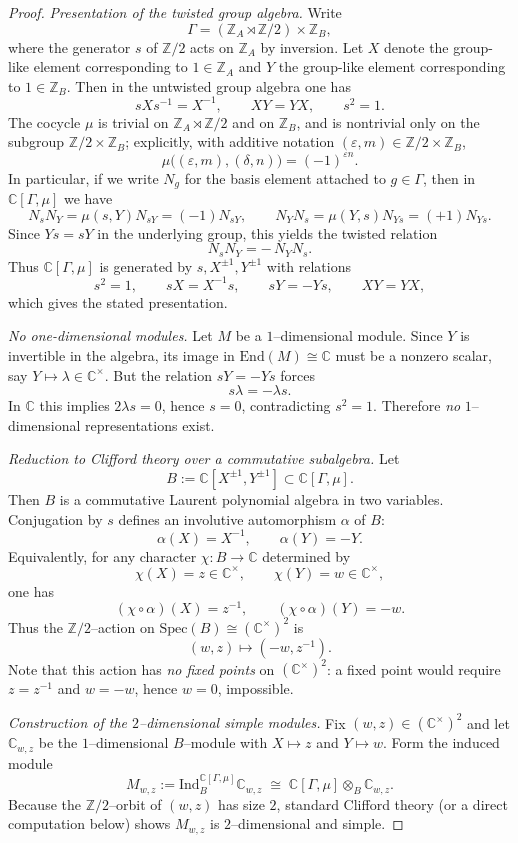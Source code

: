 \documentclass[10pt,a4paper]{amsart}
\newcommand{\C}{\mathbb{C}}
\def\Ind{\mathrm{Ind}}
\def\Spec{\mathrm{Spec}}
\newcommand{\Z}{\mathbb{Z}}
\begin{document}
\begin{proof}
\emph{Presentation of the twisted group algebra.}
Write
\[
\Gamma=(\Z_A\rtimes \Z/2)\times \Z_B,
\]
where the generator $s$ of $\Z/2$ acts on $\Z_A$ by inversion.
Let $X$ denote the group-like element corresponding to $1\in \Z_A$
and $Y$ the group-like element corresponding to $1\in \Z_B$.
Then in the untwisted group algebra one has
\[
sXs^{-1}=X^{-1},\qquad XY=YX,\qquad s^2=1.
\]
The cocycle $\mu$ is trivial on $\Z_A\rtimes \Z/2$ and on $\Z_B$,
and is nontrivial only on the subgroup $\Z/2\times \Z_B$; explicitly,
with additive notation $(\varepsilon,m)\in \Z/2\times\Z_B$,
\[
\mu\bigl((\varepsilon,m),(\delta,n)\bigr)=(-1)^{\varepsilon n}.
\]
In particular, if we write $N_g$ for the basis element attached to $g\in\Gamma$,
then in $\C[\Gamma,\mu]$ we have
\[
N_sN_Y=\mu(s,Y)N_{sY}=(-1)N_{sY},\qquad
N_YN_s=\mu(Y,s)N_{Ys}=(+1)N_{Ys}.
\]
Since $Ys=sY$ in the underlying group, this yields the twisted relation
\[
N_sN_Y=-\,N_YN_s.
\]
Thus $\C[\Gamma,\mu]$ is generated by $s,X^{\pm1},Y^{\pm1}$ with relations
\[
s^2=1,\qquad sX=X^{-1}s,\qquad sY=-Ys,\qquad XY=YX,
\]
which gives the stated presentation.

\medskip
\emph{No one-dimensional modules.}
Let $M$ be a $1$--dimensional module. Since $Y$ is invertible in the algebra,
its image in $\mathrm{End}(M)\cong \C$ must be a nonzero scalar, say $Y\mapsto \lambda\in\C^\times$.
But the relation $sY=-Ys$ forces
\[
s\lambda = -\lambda s.
\]
In $\C$ this implies $2\lambda s=0$, hence $s=0$, contradicting $s^2=1$.
Therefore \emph{no} $1$--dimensional representations exist.

\medskip
\emph{Reduction to Clifford theory over a commutative subalgebra.}
Let
\[
B:=\C[X^{\pm1},Y^{\pm1}]\subset \C[\Gamma,\mu].
\]
Then $B$ is a commutative Laurent polynomial algebra in two variables.
Conjugation by $s$ defines an involutive automorphism $\alpha$ of $B$:
\[
\alpha(X)=X^{-1},\qquad \alpha(Y)=-Y.
\]
Equivalently, for any character $\chi:B\to\C$ determined by
\[
\chi(X)=z\in\C^\times,\qquad \chi(Y)=w\in\C^\times,
\]
one has
\[
(\chi\circ\alpha)(X)=z^{-1},\qquad (\chi\circ\alpha)(Y)=-w.
\]
Thus the $\Z/2$--action on $\Spec(B)\cong(\C^\times)^2$ is
\[
(w,z)\longmapsto(-w,z^{-1}).
\]
Note that this action has \emph{no fixed points} on $(\C^\times)^2$:
a fixed point would require $z=z^{-1}$ and $w=-w$, hence $w=0$, impossible.

\medskip
\emph{Construction of the $2$--dimensional simple modules.}
Fix $(w,z)\in(\C^\times)^2$ and let $\C_{w,z}$ be the $1$--dimensional $B$--module
with $X\mapsto z$ and $Y\mapsto w$.
Form the induced module
\[
M_{w,z}:=\Ind_{B}^{\C[\Gamma,\mu]}\C_{w,z}\;\cong\;\C[\Gamma,\mu]\otimes_B \C_{w,z}.
\]
Because the $\Z/2$--orbit of $(w,z)$ has size $2$, standard Clifford theory
(or a direct computation below) shows $M_{w,z}$ is $2$--dimensional and simple.


\end{proof}
\end{document}
